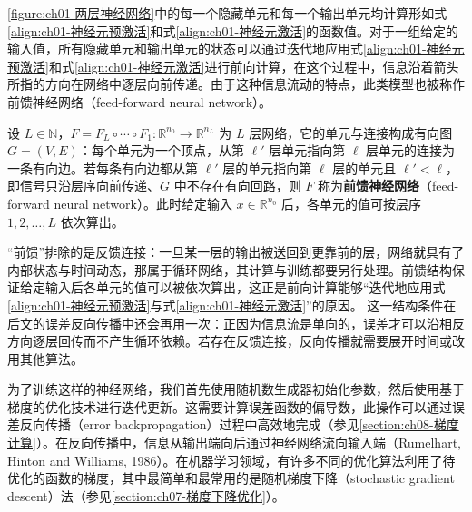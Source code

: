 \documentclass[../../main.tex]{subfiles}
\begin{document}
\cref{figure:ch01-两层神经网络}中的每一个隐藏单元和每一个输出单元均计算形如式\eqref{align:ch01-神经元预激活}和式\eqref{align:ch01-神经元激活}的函数值。对于一组给定的输入值，所有隐藏单元和输出单元的状态可以通过迭代地应用式\eqref{align:ch01-神经元预激活}和式\eqref{align:ch01-神经元激活}进行前向计算，在这个过程中，信息沿着箭头所指的方向在网络中逐层向前传递。由于这种信息流动的特点，此类模型也被称作前馈神经网络（feed-forward neural network）。

\begin{definition}[前馈神经网络]\label{definition:ch01-前馈神经网络}
设 $L\in\mathbb{N}$，$F=F_{L}\circ\cdots\circ F_{1}:\mathbb{R}^{n_{0}}\to\mathbb{R}^{n_{L}}$ 为 $L$ 层网络，它的单元与连接构成有向图 $G=(V,E)$：每个单元为一个顶点，从第 $\ell'$ 层单元指向第 $\ell$ 层单元的连接为一条有向边。若每条有向边都从第 $\ell'$ 层的单元指向第 $\ell$ 层的单元且 $\ell'<\ell$，即信号只沿层序向前传递、$G$ 中不存在有向回路，则 $F$ 称为\textbf{前馈神经网络}（feed-forward neural network）。此时给定输入 $x\in\mathbb{R}^{n_{0}}$ 后，各单元的值可按层序 $1,2,\dots,L$ 依次算出。
\end{definition}

\begin{remark}
“前馈”排除的是反馈连接：一旦某一层的输出被送回到更靠前的层，网络就具有了内部状态与时间动态，那属于循环网络，其计算与训练都要另行处理。前馈结构保证给定输入后各单元的值可以被依次算出，这正是前向计算能够“迭代地应用式\eqref{align:ch01-神经元预激活}与式\eqref{align:ch01-神经元激活}”的原因。
这一结构条件在后文的误差反向传播中还会再用一次：正因为信息流是单向的，误差才可以沿相反方向逐层回传而不产生循环依赖。若存在反馈连接，反向传播就需要展开时间或改用其他算法。
\end{remark}

为了训练这样的神经网络，我们首先使用随机数生成器初始化参数，然后使用基于梯度的优化技术进行迭代更新。这需要计算误差函数的偏导数，此操作可以通过误差反向传播（error backpropagation）过程中高效地完成（参见\cref{section:ch08-梯度计算}）。在反向传播中，信息从输出端向后通过神经网络流向输入端（Rumelhart, Hinton and Williams, 1986）。在机器学习领域，有许多不同的优化算法利用了待优化的函数的梯度，其中最简单和最常用的是随机梯度下降（stochastic gradient descent）法（参见\cref{section:ch07-梯度下降优化}）。
\end{document}
